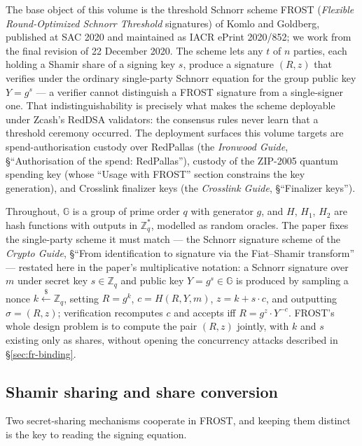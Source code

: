 \documentclass[11pt,a4paper]{article}
\theoremstyle{definition}
\newcommand{\Z}{\mathbb{Z}}
\newcommand{\G}{\mathbb{G}}
\begin{document}
The base object of this volume is the threshold Schnorr scheme FROST
(\emph{Flexible Round-Optimized Schnorr Threshold} signatures) of Komlo and
Goldberg, published at SAC 2020 and maintained as IACR ePrint 2020/852; we
work from the final revision of 22 December 2020. The scheme lets any $t$
of $n$ parties, each holding a Shamir share of a signing key $s$, produce a
signature $(R, z)$ that verifies under the ordinary single-party Schnorr
equation for the group public key $Y = g^s$ --- a verifier cannot
distinguish a FROST signature from a single-signer one. That
indistinguishability is precisely what makes the scheme deployable under
Zcash's RedDSA validators: the consensus rules never learn that a threshold
ceremony occurred. The deployment surfaces this volume targets are
spend-authorisation custody over RedPallas (the \emph{Ironwood Guide},
\S``Authorisation of the spend: RedPallas''), custody of the ZIP-2005
quantum spending key (whose ``Usage with FROST'' section constrains the key
generation), and Crosslink finalizer keys (the \emph{Crosslink Guide},
\S``Finalizer keys'').

Throughout, $\G$ is a group of prime order $q$ with generator $g$, and
$H$, $H_1$, $H_2$ are hash functions with outputs in $\Z_q^*$, modelled as
random oracles. The paper fixes the single-party scheme it must match
--- the Schnorr signature scheme of the \emph{Crypto Guide}, \S``From
identification to signature via the Fiat--Shamir transform'' ---
restated here in the paper's multiplicative notation: a Schnorr
signature over $m$ under secret key $s \in \Z_q$ and
public key $Y = g^s \in \G$ is produced by sampling a nonce
$k \xleftarrow{\$} \Z_q$, setting $R = g^k$, $c = H(R, Y, m)$,
$z = k + s \cdot c$, and outputting $\sigma = (R, z)$; verification
recomputes $c$ and accepts iff $R = g^z \cdot Y^{-c}$. FROST's whole design
problem is to compute the pair $(R, z)$ jointly, with $k$ and $s$ existing
only as shares, without opening the concurrency attacks described in
\S\ref{sec:fr-binding}.

\subsection{Shamir sharing and share conversion}\label{sec:fr-shamir}

Two secret-sharing mechanisms cooperate in FROST, and keeping them distinct
is the key to reading the signing equation.
\end{document}
